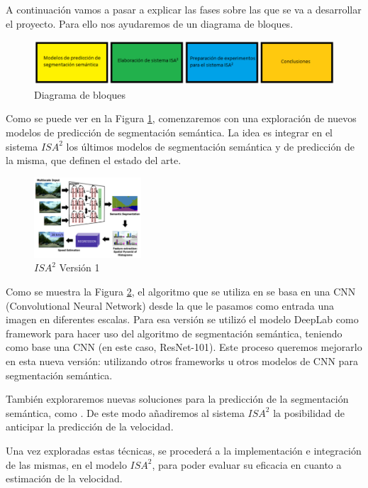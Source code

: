 \documentclass[12pt,oneside,a4paper]{article}
\begin{document}
A continuación vamos a pasar a explicar las fases sobre las que se va a desarrollar el proyecto. Para ello nos ayudaremos de un diagrama de bloques.

\begin{figure}[h]
  \centering
  \includegraphics[width=16cm]{figuras/Diagrama_Bloques.eps}
  \caption{Diagrama de bloques}
  \label{fig:diagrama_bloques}
\end{figure}


Como se puede ver en la Figura \ref{fig:diagrama_bloques}, comenzaremos con una exploración de nuevos modelos de predicción de segmentación semántica. La idea es integrar en el sistema $ISA^2$ los últimos modelos de segmentación semántica y de predicción de la misma, que definen el estado del arte. 

\begin{figure}[H]
  \centering
  \includegraphics[width=4cm]{figuras/Figura_Esquema_ISA2_Version_1_SegSem.eps}
  \caption{$ISA^2$ Versión 1}
  \label{fig:isa_v1}
\end{figure}

Como se muestra la Figura \ref{fig:isa_v1}, el algoritmo que se utiliza en \cite{isa2} se basa en una CNN (Convolutional Neural Network) desde la que le pasamos como entrada una imagen en diferentes escalas. Para esa versión se utilizó el modelo DeepLab \cite{deeplab} como framework para hacer uso del algoritmo de segmentación semántica, teniendo como base una CNN (en este caso, ResNet-101). Este proceso queremos mejorarlo en esta nueva versión: utilizando otros frameworks u otros modelos de CNN para segmentación semántica. 

También exploraremos nuevas soluciones para la predicción de la segmentación semántica, como \cite{segmpred}. De este modo añadiremos al sistema $ISA^2$ la posibilidad de anticipar la predicción de la velocidad.

Una vez exploradas estas técnicas, se procederá a la implementación e integración de las mismas, en el modelo $ISA^2$, para poder evaluar su eficacia en cuanto a estimación de la velocidad. 
\end{document}
